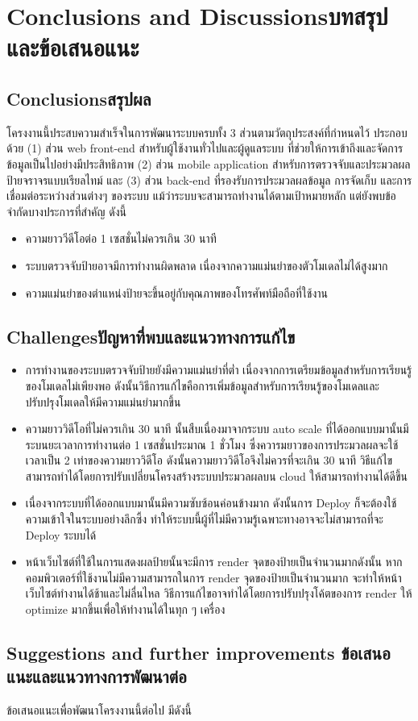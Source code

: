 \chapter{\ifenglish Conclusions and Discussions\else บทสรุปและข้อเสนอแนะ\fi}

\section{\ifenglish Conclusions\else สรุปผล\fi}

โครงงานนี้ประสบความสำเร็จในการพัฒนาระบบครบทั้ง 3 ส่วนตามวัตถุประสงค์ที่กำหนดไว้ ประกอบด้วย (1) ส่วน web front-end สำหรับผู้ใช้งานทั่วไปและผู้ดูแลระบบ ที่ช่วยให้การเข้าถึงและจัดการข้อมูลเป็นไปอย่างมีประสิทธิภาพ (2) ส่วน mobile application สำหรับการตรวจจับและประมวลผลป้ายจราจรแบบเรียลไทม์ และ (3) ส่วน back-end ที่รองรับการประมวลผลข้อมูล การจัดเก็บ และการเชื่อมต่อระหว่างส่วนต่างๆ ของระบบ แม้ว่าระบบจะสามารถทำงานได้ตามเป้าหมายหลัก แต่ยังพบข้อจำกัดบางประการที่สำคัญ ดังนี้

\begin{itemize}
    \item ความยาววีดีโอต่อ 1 เซสชั่นไม่ควรเกิน 30 นาที
    \item ระบบตรวจจับป้ายอาจมีการทำงานผิดพลาด เนื่องจากความแม่นยำของตัวโมเดลไม่ได้สูงมาก
    \item ความแม่นยำของตำแหน่งป้ายจะขึ้นอยู่กับคุณภาพของโทรศัพท์มือถือที่ใช้งาน
\end{itemize}

\section{\ifenglish Challenges\else ปัญหาที่พบและแนวทางการแก้ไข\fi}

\begin{itemize}
    \item การทำงานของระบบตรวจจับป้ายยังมีความแม่นยำที่ต่ำ เนื่องจากการเตรียมข้อมูลสำหรับการเรียนรู้ของโมเดลไม่เพียงพอ ดังนั้นวิธีการแก้ไขคือการเพิ่มข้อมูลสำหรับการเรียนรู้ของโมเดลและปรับปรุงโมเดลให้มีความแม่นยำมากขึ้น
    \item ความยาววิดีโอที่ไม่ควรเกิน 30 นาที นั้นสืบเนื่องมาจากระบบ auto scale ที่ได้ออกแบบมานั้นมีระบนยะเวลาการทำงานต่อ 1 เซสชั่นประมาณ 1 ชั่วโมง ซึ่งควารมยาวของการประมวลผลจะใช้เวลาเป็น 2 เท่าของความยาววิดีโอ ดังนั้นความยาววิดีโอจึงไม่ควรที่จะเกิน 30 นาที วิธีแก้ไขสามารถทำได้โดยการปรับเปลี่ยนโครงสร้างระบบประมวลผลบน cloud ให้สามารถทำงานได้ดีขึ้น
    \item เนื่องจากระบบที่ได้ออกแบบมานั้นมีความซับซ้อนค่อนข้างมาก ดังนั้นการ Deploy ก็จะต้องใช้ความเข้าใจในระบบอย่างลึกซึ้ง ทำให้ระบบนี้ผู้ที่ไม่มีความรู้เฉพาะทางอาจจะไม่สามารถที่จะ Deploy ระบบได้
    \item หน้าเว็บไซต์ที่ใช้ในการแสดงผลป้ายนั้นจะมีการ render จุดของป้ายเป็นจำนวนมากดังนั้น หากคอมพิวเตอร์ที่ใช้งานไม่มีความสามารถในการ render จุดของป้ายเป็นจำนวนมาก จะทำให้หน้าเว็บไซต์ทำงานได้ช้าและไม่ลื่นไหล วิธีการแก้ไขอาจทำได้โดยการปรับปรุงโค้ตของการ render ให้ optimize มากขึ้นเพื่อให้ทำงานได้ในทุก ๆ เครื่อง
\end{itemize}

\section{\ifenglish%
Suggestions and further improvements
\else%
ข้อเสนอแนะและแนวทางการพัฒนาต่อ
\fi
}

ข้อเสนอแนะเพื่อพัฒนาโครงงานนี้ต่อไป มีดังนี้